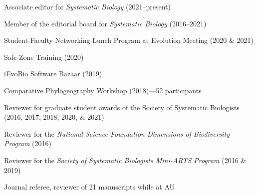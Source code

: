 \begin{veryTightItemize}
    \item Associate editor for \emph{Systematic Biology}
        (2021--present)
    \item Member of the editorial board for \emph{Systematic Biology}
        (2016--2021)
    \item Student-Faculty Networking Lunch Program at Evolution Meeting (2020 \& 2021)
    \item Safe-Zone Training (2020)
    \item iEvoBio Software Bazaar (2019)
    \item Comparative Phylogeography Workshop (2018)---52 participants
    \item Reviewer for graduate student awards of the Society of Systematic
        Biologists (2016, 2017, 2018, 2020, \& 2021)
    \item Reviewer for the \emph{National Science Foundation Dimensions of
            Biodiversity Program} (2016)
    \item Reviewer for the \emph{Society of Systematic Biologists Mini-ARTS
            Program} (2016 \& 2019)
    \item Journal referee, reviewer of 21 manuscripts while at AU
\end{veryTightItemize}
